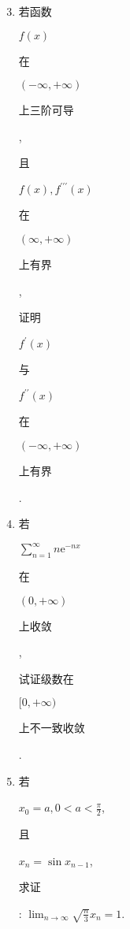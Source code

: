 \documentclass[10pt]{article}
\begin{document}
\begin{enumerate}
  \setcounter{enumi}{2}
  \item \begin{CJK}{UTF8}{mj}若函数\end{CJK} $f(x)$ \begin{CJK}{UTF8}{mj}在\end{CJK} $(-\infty,+\infty)$ \begin{CJK}{UTF8}{mj}上三阶可导\end{CJK}, \begin{CJK}{UTF8}{mj}且\end{CJK} $f(x), f^{\prime \prime \prime}(x)$ \begin{CJK}{UTF8}{mj}在\end{CJK} $(\infty,+\infty)$ \begin{CJK}{UTF8}{mj}上有界\end{CJK}, \begin{CJK}{UTF8}{mj}证明\end{CJK} $f^{\prime}(x)$ \begin{CJK}{UTF8}{mj}与\end{CJK} $f^{\prime \prime}(x)$ \begin{CJK}{UTF8}{mj}在\end{CJK} $(-\infty,+\infty)$ \begin{CJK}{UTF8}{mj}上有界\end{CJK}.

  \item \begin{CJK}{UTF8}{mj}若\end{CJK} $\sum_{n=1}^{\infty} n \mathrm{e}^{-n x}$ \begin{CJK}{UTF8}{mj}在\end{CJK} $(0,+\infty)$ \begin{CJK}{UTF8}{mj}上收敛\end{CJK}, \begin{CJK}{UTF8}{mj}试证级数在\end{CJK} $[0,+\infty)$ \begin{CJK}{UTF8}{mj}上不一致收敛\end{CJK}.

  \item \begin{CJK}{UTF8}{mj}若\end{CJK} $x_{0}=a, 0<a<\frac{\pi}{2}$, \begin{CJK}{UTF8}{mj}且\end{CJK} $x_{n}=\sin x_{n-1}$, \begin{CJK}{UTF8}{mj}求证\end{CJK}: $\lim _{n \rightarrow \infty} \sqrt{\frac{n}{3}} x_{n}=1$.


\end{enumerate}
\end{document}
